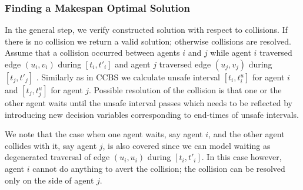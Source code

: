 
\subsubsection{Finding a Makespan Optimal Solution}



In the general step, we verify constructed solution with respect to collisions. If there is no collision we return a valid solution; otherwise collisions are resolved. Assume that a collision occurred between agents $i$ and $j$ while agent $i$ traversed edge $(u_i,v_i)$ during $[t_i,t'_i]$ and agent $j$ traversed edge $(u_j,v_j)$ during $[t_j,t'_j]$  . Similarly as in CCBS we calculate unsafe interval $[t_i,t_i^u]$ for agent $i$  and $[t_j,t_j^u]$ for agent $j$. Possible resolution of the collision is that one or the other agent waits   until the unsafe interval passes which needs to be reflected by introducing new decision variables corresponding to end-times of unsafe intervals.

We note that the case when one agent waits, say agent $i$, and the other agent collides with it, say agent $j$, is also covered since we can model waiting as degenerated traversal of edge $(u_i, u_i)$ during $[t_i,t'_i]$. In this case however, agent $i$ cannot do anything to avert the collision; the collision can be resolved only on the side of agent $j$.


